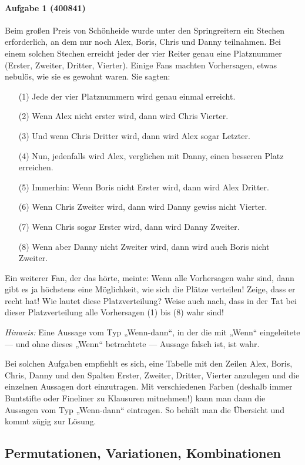 \documentclass[11pt,a4paper]{article}
\begin{document}
\paragraph{Aufgabe 1 (400841)} 
Beim großen Preis von Schönheide wurde unter den Springreitern ein Stechen
erforderlich, an dem nur noch Alex, Boris, Chris und Danny teilnahmen. Bei
einem solchen Stechen erreicht jeder der vier Reiter genau eine Platznummer
(Erster, Zweiter, Dritter, Vierter). Einige Fans machten Vorhersagen, etwas
nebulös, wie sie es gewohnt waren. Sie sagten:
\begin{itemize}
\item[(1)] Jede der vier Platznummern wird genau einmal erreicht.
\item[(2)] Wenn Alex nicht erster wird, dann wird Chris Vierter.
\item[(3)] Und wenn Chris Dritter wird, dann wird Alex sogar Letzter.
\item[(4)] Nun, jedenfalls wird Alex, verglichen mit Danny, einen besseren
  Platz erreichen.
\item[(5)] Immerhin: Wenn Boris nicht Erster wird, dann wird Alex Dritter.
\item[(6)] Wenn Chris Zweiter wird, dann wird Danny gewiss nicht Vierter.
\item[(7)] Wenn Chris sogar Erster wird, dann wird Danny Zweiter.
\item[(8)] Wenn aber Danny nicht Zweiter wird, dann wird auch Boris nicht
  Zweiter.
\end{itemize}
Ein weiterer Fan, der das hörte, meinte: Wenn alle Vorhersagen wahr sind, dann
gibt es ja höchstens eine Möglichkeit, wie sich die Plätze verteilen! Zeige,
dass er recht hat! Wie lautet diese Platzverteilung? Weise auch nach, dass in
der Tat bei dieser Platzverteilung alle Vorhersagen (1) bis (8) wahr
sind!

\textit{Hinweis:} Eine Aussage vom Typ „Wenn-dann“, in der die mit „Wenn“
eingeleitete --- und ohne dieses „Wenn“ betrachtete --- Aussage falsch ist,
ist wahr.

Bei solchen Aufgaben empfiehlt es sich, eine Tabelle mit den Zeilen Alex,
Boris, Chris, Danny und den Spalten Erster, Zweiter, Dritter, Vierter
anzulegen und die einzelnen Aussagen dort einzutragen. Mit verschiedenen
Farben (deshalb immer Buntstifte oder Fineliner zu Klausuren mitnehmen!) kann
man dann die Aussagen vom Typ „Wenn-dann“ eintragen. So behält man die
Übersicht und kommt zügig zur Lösung.

\subsection*{Permutationen, Variationen, Kombinationen}
\end{document}
